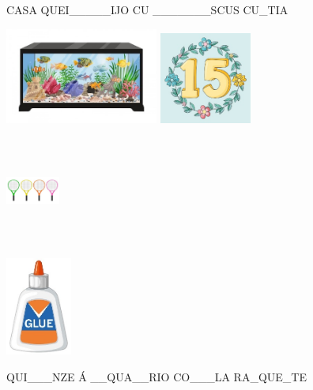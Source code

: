 CASA QUEI\_\_\_\_\_IJO CU \_\_\_\_\_\_\_SCUS CU\_TIA

\includegraphics[width=1.98343in,height=1.24038in]{media/image30.jpeg}
\includegraphics[width=1.18269in,height=1.18269in]{media/image31.jpeg}

\includegraphics[width=0.70192in,height=1.39623in]{media/image32.jpeg}

\includegraphics[width=0.85819in,height=1.27885in]{media/image33.jpeg}

QUI\_\_\_NZE Á \_\_QUA\_\_RIO CO\_\_\_LA RA\_QUE\_TE


